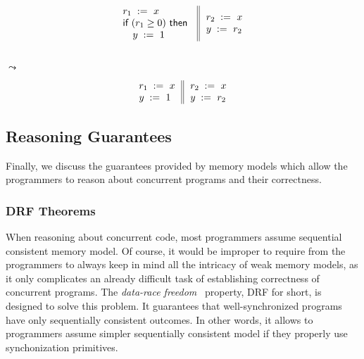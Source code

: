 {\footnotesize
\begin{minipage}{0.45\linewidth}
\begin{equation*}
\inarrII{
   \readInst{}{r_1}{x}             \\
   \kw{if} (r_1 \geq 0) ~\kw{then} \\
   \quad\writeInst{}{y}{1}         \\
}{
  \readInst{}{r_2}{x}               \\
  \writeInst{}{y}{r_2}              \\
}
\end{equation*}
\end{minipage}\hfill%
\begin{minipage}{0.05\linewidth}
\Large~\\ $\leadsto$
\end{minipage}\hfill%
\begin{minipage}{0.4\linewidth}
\begin{equation*}
\inarrII{
   \readInst{}{r_1}{x}             \\
   \writeInst{}{y}{1}              \\
}{
  \readInst{}{r_2}{x}               \\
  \writeInst{}{y}{r_2}              \\
}
\end{equation*}
\end{minipage}
}

\subsection{Reasoning Guarantees}

Finally, we discuss the guarantees provided by memory models 
which allow the programmers to reason about concurrent 
programs and their correctness. 

\subsubsection{DRF Theorems}
\label{sec:background:drf}

When reasoning about concurrent code, most programmers 
assume sequential consistent memory model.
Of course, it would be improper to require from 
the programmers to always keep in mind 
all the intricacy of weak memory models,
as it only complicates an already difficult task
of establishing correctness of concurrent programs. 
The \emph{data-race freedom}~\cite{Manson-al:POPL05} property, 
DRF for short, is designed to solve this problem. 
It guarantees that well-synchronized programs 
have only sequentially consistent outcomes. 
In other words, it allows to programmers assume 
simpler sequentially consistent model 
if they properly use synchonization primitives.

